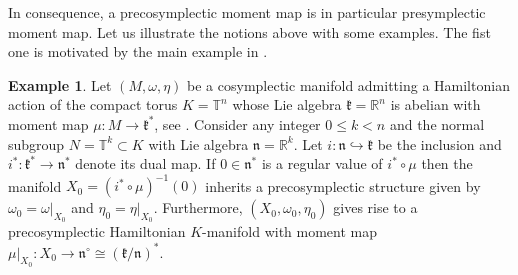 \documentclass[
  a4paper, 
  reqno, 
  oneside, 
  12pt
]{amsart}
\theoremstyle{definition}
\newtheorem{example}[theorem]{Example}
\theoremstyle{remark}
\begin{document}
In consequence, a precosymplectic moment map is in particular presymplectic moment map. Let us illustrate the notions above with some examples. The fist one is motivated by the main example in \cite{HoffmanSjamaar}.

\begin{example}
	\label{Ex:Precosymplecticfromcosymplectic}
	Let $(M,\omega,\eta)$ be a cosymplectic manifold admitting a Hamiltonian action of the compact torus $K=\mathbb{T}^n$ whose Lie algebra $\mathfrak{k}=\mathbb{R}^n$ is abelian with moment map $\mu:M\to \mathfrak{k}^\ast$, see \cite{BazzoniGoertsches2}. Consider any integer $0\leq k< n$ and the normal subgroup $N=\mathbb{T}^k\subset K$ with Lie algebra $\mathfrak{n}=\mathbb{R}^k$. Let $i:\mathfrak{n}\hookrightarrow \mathfrak{k}$ be the inclusion and $i^\ast:\mathfrak{k}^\ast \to \mathfrak{n}^\ast$ denote its dual map. If $0\in \mathfrak{n}^*$ is a regular value of $i^\ast \circ \mu$ then the manifold $X_0=(i^*\circ \mu)^{-1}(0)$ inherits a precosymplectic structure given by $\omega_0=\omega|_{X_0}$ and $\eta_0=\eta|_{X_0}$. Furthermore, $(X_0,\omega_0,\eta_0)$ gives rise to a precosymplectic Hamiltonian $K$-manifold with moment map $\mu|_{X_0}:X_0\to \mathfrak{n}^\circ \cong (\mathfrak{k}/\mathfrak{n})^\ast$.
\end{example}
\end{document}
